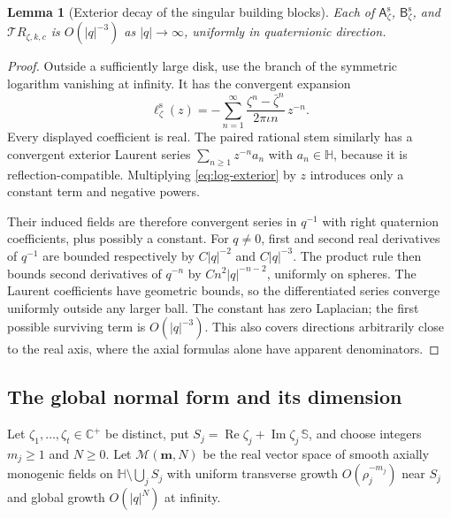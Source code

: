 \documentclass[11pt,a4paper]{article}
\numberwithin{equation}{section}
\newtheorem{lemma}[theorem]{Lemma}
\theoremstyle{definition}
\theoremstyle{remark}
\newcommand{\C}{\mathbb C}
\newcommand{\HH}{\mathbb H}
\newcommand{\Sph}{\mathbb S}
\newcommand{\T}{\mathcal T}
\newcommand{\Asym}{\mathsf A^{\mathrm s}}
\newcommand{\Bsym}{\mathsf B^{\mathrm s}}
\begin{document}
\begin{lemma}[Exterior decay of the singular building blocks]
\label{lem:exterior}
Each of $\Asym_\zeta$, $\Bsym_\zeta$, and
$\T R_{\zeta,k,c}$ is $O(|q|^{-3})$ as $|q|\to\infty$, uniformly
in quaternionic direction.
\end{lemma}
\begin{proof}
Outside a sufficiently large disk, use the branch of the symmetric
logarithm vanishing at infinity. It has the convergent expansion
\begin{equation}
 \ell^{\mathrm s}_\zeta(z)
 =-\sum_{n=1}^{\infty}
     \frac{\zeta^n-\bar\zeta^n}{2\pi\iota n}\,z^{-n}.
 \label{eq:log-exterior}
\end{equation}
Every displayed coefficient is real. The paired rational stem similarly
has a convergent exterior Laurent series $\sum_{n\ge1}z^{-n}a_n$ with
$a_n\in\HH$, because it is reflection-compatible. Multiplying
\eqref{eq:log-exterior} by $z$ introduces only a constant term and
negative powers.

Their induced fields are therefore convergent series in $q^{-1}$ with
right quaternion coefficients, plus possibly a constant. For $q\ne0$,
first and second real derivatives of $q^{-1}$ are bounded respectively
by $C|q|^{-2}$ and $C|q|^{-3}$. The product rule then bounds second
derivatives of $q^{-n}$ by $C n^2|q|^{-n-2}$, uniformly on spheres.
The Laurent coefficients have geometric bounds, so the differentiated
series converge uniformly outside any larger ball. The constant has
zero Laplacian; the first possible surviving term is $O(|q|^{-3})$.
This also covers directions arbitrarily close to the real axis, where
the axial formulas alone have apparent denominators.
\end{proof}

\subsection{The global normal form and its dimension}
Let $\zeta_1,\ldots,\zeta_t\in\C^+$ be distinct, put
$S_j=\operatorname{Re}\zeta_j+\operatorname{Im}\zeta_j\,\Sph$, and choose
integers $m_j\ge1$ and $N\ge0$. Let $\mathcal M(\boldsymbol m,N)$ be
the real vector space of smooth axially monogenic fields on
$\HH\setminus\bigcup_jS_j$ with uniform transverse growth
$O(\rho_j^{-m_j})$ near $S_j$ and global growth $O(|q|^N)$ at infinity.
\end{document}
